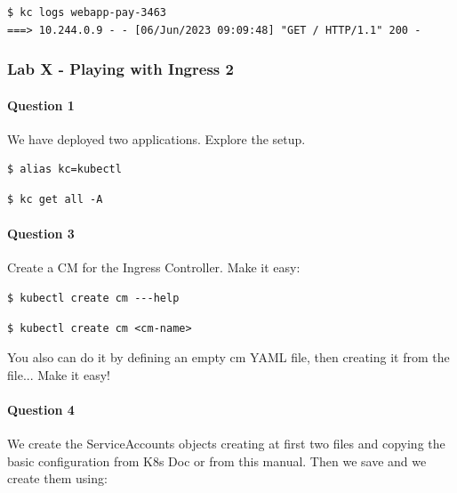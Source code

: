 \documentclass{article}
\newenvironment{codetemplate}[1][]{%
  \mybasecolorbox[#1]
  \itshape
}{%
  \endmybasecolorbox
}
\begin{document}
\begin{codetemplate}{}
\begin{verbatim}
$ kc logs webapp-pay-3463
===> 10.244.0.9 - - [06/Jun/2023 09:09:48] "GET / HTTP/1.1" 200 -
\end{verbatim}
\end{codetemplate}

\subsubsection{Lab X - Playing with Ingress 2}

\paragraph{Question 1}
We have deployed two applications. Explore the setup.
\begin{codetemplate}{}
\begin{verbatim}
$ alias kc=kubectl
\end{verbatim}
\end{codetemplate}
\begin{codetemplate}{}
\begin{verbatim}
$ kc get all -A
\end{verbatim}
\end{codetemplate}

\paragraph{Question 3}
Create a CM for the Ingress Controller. Make it easy:

\begin{codetemplate}{}
\begin{verbatim}
$ kubectl create cm ---help
\end{verbatim}
\end{codetemplate}

\begin{codetemplate}{}
\begin{verbatim}
$ kubectl create cm <cm-name>
\end{verbatim}
\end{codetemplate}

You also can do it by defining an empty cm YAML file, then creating it from the file... Make it easy!

\paragraph{Question 4}
We create the ServiceAccounts objects creating at first two files and copying the basic configuration from K8s Doc or from this manual. Then we save and we create them using:
\end{document}

